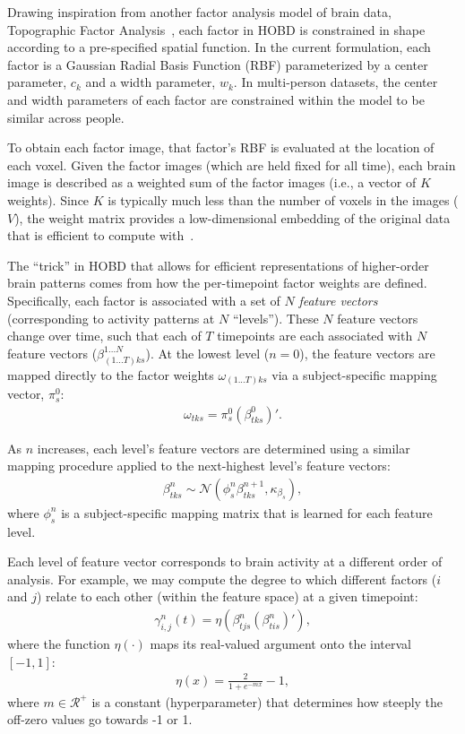 \documentclass[12pt]{article}
\begin{document}
Drawing inspiration from another factor analysis
model of brain data, Topographic Factor Analysis~\citep{MannEtal14b},
each factor in HOBD is constrained in shape according to a
pre-specified spatial function.  In the current formulation, each
factor is a Gaussian Radial Basis Function (RBF) parameterized by a
center parameter, $c_k$ and a width parameter, $w_k$.  In multi-person
datasets, the center and width parameters of each factor are
constrained within the model to be similar across people.

To obtain each factor image, that factor's RBF is evaluated at the
location of each voxel.  Given the factor images (which are held fixed
for all time), each brain image is described as a weighted sum of the
factor images (i.e., a vector of $K$ weights).  Since $K$ is typically
much less than the number of voxels in the images ($V$), the weight
matrix provides a low-dimensional embedding of the original data that
is efficient to compute with~\citep{MannEtal14b}.

The ``trick'' in HOBD that allows for efficient representations of
higher-order brain patterns comes from how the per-timepoint factor
weights are defined.  Specifically, each factor is associated with a set of $N$
\textit{feature vectors} (corresponding to activity patterns at $N$
``levels'').  These $N$ feature vectors change over time, such that
each of $T$ timepoints are each associated with $N$ feature vectors ($\beta^{1...N}_{(1...T)ks}$).  At the
lowest level ($n = 0$), the feature vectors are mapped directly to the
factor weights $\omega_{(1...T)ks}$ via a subject-specific mapping vector, $\pi^0_s$:
\begin{align}
\omega_{tks} = \pi^0_s\left(\beta^0_{tks}\right)'.
\end{align}

As $n$ increases, each level's feature vectors are determined using a
similar mapping procedure applied to the next-highest level's feature
vectors:
\begin{align}
\beta^n_{tks} \sim \mathcal{N}\left(\phi^n_s\beta^{n+1}_{tks}, \kappa_{\beta_s}\right),
\end{align}
where $\phi^n_s$ is a subject-specific mapping matrix that is learned
for each feature level.

Each level of feature vector corresponds to brain activity at a
different order of analysis.  For example, we may compute the degree
to which different factors ($i$ and $j$) relate to each other (within
the feature space) at a given timepoint:
\begin{align}
\gamma^n_{i,j}(t) = \eta\left(\beta^n_{tjs}\left(\beta^n_{tis}\right)'\right),
\end{align}
where the function $\eta(\cdot)$ maps its real-valued argument onto
the interval $[-1, 1]$:
\begin{align}
\eta(x) = \frac{2}{1 + e^{-mx}} - 1,
\end{align}
where $m \in \mathcal{R}^+$ is a constant (hyperparameter) that
determines how steeply the off-zero values go towards -1 or 1.
\end{document}
